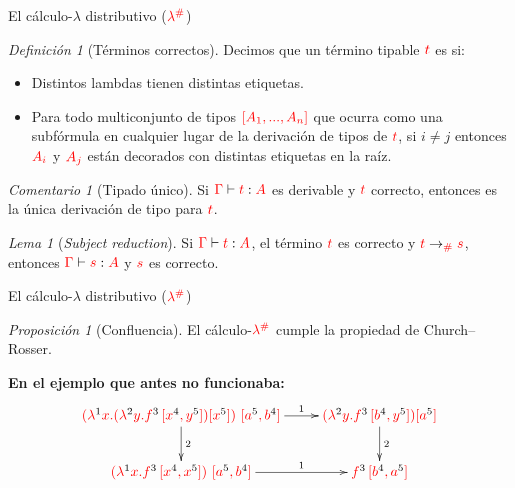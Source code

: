 \documentclass{beamer}
\theoremstyle{remark}
\newtheorem{defes}{Definición}
\newtheorem{lemes}{Lema}
\newtheorem{proes}{Proposición}
\newtheorem{comes}{Comentario}
\newcommand{\cDist}[1]{{\color{red} #1}}
\newcommand{\clambdadist}{\cDist{\lambdadist}}
\newcommand{\cLab}[1]{{\color{black} #1}}
\begin{document}
\begin{frame}{El cálculo-$\lambda$ distributivo ($\clambdadist$)}
\begin{defes}[Términos correctos]
Decimos que un término tipable $\cDist{t}$ es  si:
\begin{itemize}
\item Distintos lambdas tienen distintas etiquetas.
\item Para todo multiconjunto de tipos $\cDist{[A_1, ..., A_n]}$ que ocurra como una subfórmula
en cualquier lugar de la derivación de tipos de $\cDist{t}$, si $i\neq j$ entonces
$\cDist{A_i}$ y $\cDist{A_j}$ están decorados con distintas etiquetas en la raíz.
\end{itemize}
\end{defes}

\begin{comes}[Tipado único]
Si $\cDist{\tctx} \vdash \cDist{t} : \cDist{A}$ es derivable y $\cDist{t}$ correcto,
entonces es la única derivación de tipo para $\cDist{t}$.
\end{comes}

\begin{lemes}[\emph{Subject reduction}]
Si $\cDist{\tctx} \vdash \cDist{t} : \cDist{A}$, el término $\cDist{t}$
es correcto y $\cDist{t} \to_{\cDist{\dist}} \cDist{s}$,
entonces $\cDist{\tctx} \vdash \cDist{s} : \cDist{A}$ y $\cDist{s}$ es correcto.
\end{lemes}
\end{frame}


\begin{frame}{El cálculo-$\lambda$ distributivo ($\clambdadist$)}
\begin{proes}[Confluencia]
El cálculo-$\clambdadist$ cumple la propiedad de Church--Rosser.
\end{proes}

\vskip 1cm
\textbf{En el ejemplo que antes no funcionaba:}
\[
\xymatrix{
  \cDist{(\lamp{\cLab1}{x}{(\lamp{\cLab2}{y}{f^{\cLab3}\,[x^{\cLab4}, y^{\cLab5}]}) [x^{\cLab5}]})\ [a^{\cLab5}, b^{\cLab4}]} \ar^-{2}[d] \ar^-{1}[r] & \cDist{(\lamp{\cLab2}{y}{f^{\cLab3}\,[b^{\cLab4}, y^{\cLab5}]}) [a^{\cLab5}]} \ar^-{2}[d] \\
  \cDist{(\lamp{\cLab1}{x}{f^{\cLab3}\,[x^{\cLab4}, x^{\cLab5}]})\ [a^{\cLab5}, b^{\cLab4}]} \ar^-{1}[r] & \cDist{f^{\cLab3}\,[b^{\cLab4}, a^{\cLab5}]}\\
}
\]
\end{frame}
\end{document}
